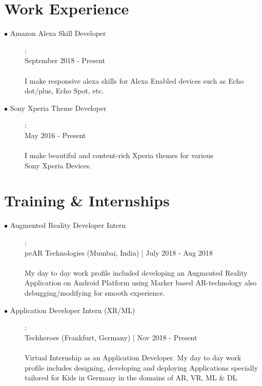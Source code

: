 \documentclass[11pt]{article}
\begin{document}
\section{Work Experience}
\begin{description}
    \item[$\bullet$ Amazon Alexa Skill Developer]:
    \\September 2018 - Present
    \\\\I make responsive alexa skills for Alexa Enabled devices such as Echo dot/plus, Echo Spot, etc.  
    \item[$\bullet$ Sony Xperia Theme Developer]:
    \\May 2016 - Present
    \\\\I make beautiful and content-rich Xperia themes for various \\Sony Xperia Devices.

\end{description}
\section{Training \& Internships}
\begin{description}
    \item[$\bullet$ Augmented Reality Developer Intern]:
    \\peAR Technologies (Mumbai, India) | July 2018 - Aug 2018
    \\\\My day to day work profile included developing an Augmented Reality Application on Android Platform using Marker based AR-technology also debugging/modifying for smooth experience.

    \item[$\bullet$ Application Developer Intern (XR/ML)]:
    \\Techheroes (Frankfurt, Germany) | Nov 2018 - Present
    \\\\Virtual Internship as an Application Developer. My day to day work profile includes designing, developing and deploying Applications specially tailored for Kids in Germany in the domains of AR, VR, ML \& DL

\end{description}
\end{document}
